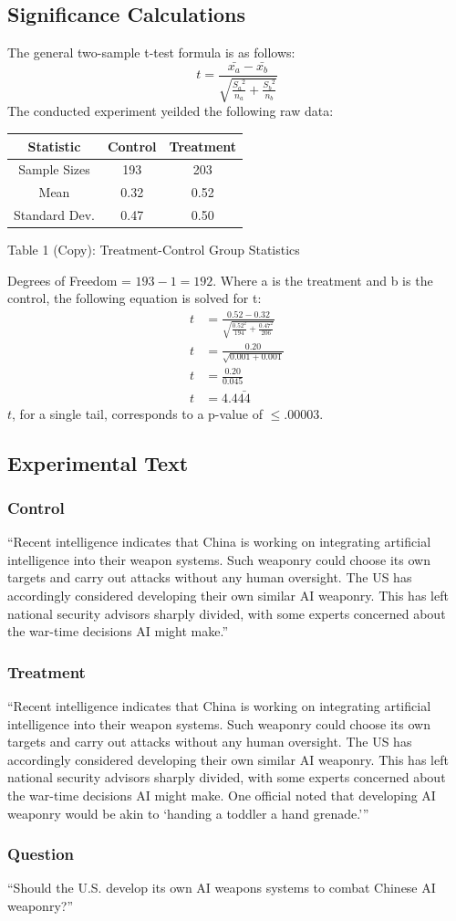 \documentclass[12pt]{article}
\begin{document}
\subsection {Significance Calculations}
The general two-sample t-test formula is as follows:
$$t = \frac{\bar{x_a} - \bar{x_b}}{\sqrt{\frac{{S_a}^2}{n_a} + \frac{{S_b}^2}{n_b}}}$$
The conducted experiment yeilded the following raw data:
\begin {table} [!ht]
  \centering
  \begin {tabular} {c|c|c} 
    Statistic&Control&Treatment \\
    \hline
    Sample Sizes&193&203 \\
    Mean&0.32&0.52 \\
    Standard Dev.&0.47&0.50 \\
  \end {tabular}
  \bigbreak
  Table 1 (Copy): Treatment-Control Group Statistics
\end {table}
\smallbreak
Degrees of Freedom = $193 - 1 = 192$.
\bigbreak
Where a is the treatment and b is the control, the following equation is solved for t: 
\begin{align}
t &= \frac{0.52 - 0.32}{\sqrt{\frac{{0.52}^2}{194} + \frac{{0.47}^2}{206}}} \\ 
t &= \frac{0.20}{\sqrt{0.001 + 0.001}} \\
t &= \frac{0.20}{0.045} \\
t &= 4.4\bar{44}
\end{align}
$t$, for a single tail, corresponds to a p-value of $\le .00003$.
\newpage
\subsection {Experimental Text}
\subsubsection {Control}
``Recent intelligence indicates that China is working on integrating artificial intelligence into their weapon systems. Such weaponry could choose its own targets and carry out attacks without any human oversight. The US has accordingly considered developing their own similar AI weaponry. This has left national security advisors sharply divided, with some experts concerned about the war-time decisions AI might make.''
\subsubsection {Treatment}
``Recent intelligence indicates that China is working on integrating artificial intelligence into their weapon systems. Such weaponry could choose its own targets and carry out attacks without any human oversight. The US has accordingly considered developing their own similar AI weaponry. This has left national security advisors sharply divided, with some experts concerned about the war-time decisions AI might make. One official noted that developing AI weaponry would be akin to ‘handing a toddler a hand grenade.’''
\subsubsection {Question}
``Should the U.S. develop its own AI weapons systems to combat Chinese AI weaponry?''
\end{document}

